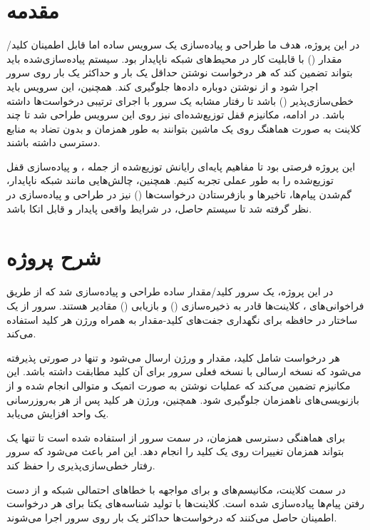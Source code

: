 \section*{مقدمه}

در این پروژه، هدف ما طراحی و پیاده‌سازی یک سرویس ساده اما قابل اطمینان کلید/مقدار () با قابلیت کار در محیط‌های شبکه ناپایدار بود. سیستم پیاده‌سازی‌شده باید بتواند تضمین کند که هر درخواست نوشتن حداقل یک بار و حداکثر یک بار روی سرور اجرا شود و از نوشتن دوباره داده‌ها جلوگیری کند. همچنین، این سرویس باید خطی‌سازی‌پذیر () باشد تا رفتار مشابه یک سرور  با اجرای ترتیبی درخواست‌ها داشته باشد. در ادامه، مکانیزم قفل توزیع‌شده‌ای نیز روی این سرویس طراحی شد تا چند کلاینت به صورت هماهنگ روی یک ماشین بتوانند به طور همزمان و بدون تضاد به منابع دسترسی داشته باشند.

این پروژه فرصتی بود تا مفاهیم پایه‌ای رایانش توزیع‌شده از جمله ،  و پیاده‌سازی قفل توزیع‌شده را به طور عملی تجربه کنیم. همچنین، چالش‌هایی مانند شبکه ناپایدار، گم‌شدن پیام‌ها، تاخیرها و بازفرستادن درخواست‌ها () نیز در طراحی و پیاده‌سازی در نظر گرفته شد تا سیستم حاصل، در شرایط واقعی پایدار و قابل اتکا باشد.

\section*{شرح پروژه}

در این پروژه، یک سرور کلید/مقدار ساده طراحی و پیاده‌سازی شد که از طریق فراخوانی‌های ، کلاینت‌ها قادر به ذخیره‌سازی () و بازیابی () مقادیر هستند. سرور از یک ساختار  در حافظه برای نگهداری جفت‌های کلید-مقدار به همراه ورژن  هر کلید استفاده می‌کند.

هر درخواست  شامل کلید، مقدار و ورژن ارسال می‌شود و تنها در صورتی پذیرفته می‌شود که نسخه ارسالی با نسخه فعلی سرور برای آن کلید مطابقت داشته باشد. این مکانیزم تضمین می‌کند که عملیات نوشتن به صورت اتمیک و متوالی انجام شده و از بازنویسی‌های ناهمزمان جلوگیری شود. همچنین، ورژن هر کلید پس از هر به‌روزرسانی یک واحد افزایش می‌یابد.

برای هماهنگی دسترسی همزمان، در سمت سرور از   استفاده شده است تا تنها یک  بتواند همزمان تغییرات روی یک کلید را انجام دهد. این امر باعث می‌شود که سرور رفتار خطی‌سازی‌پذیری را حفظ کند.

در سمت کلاینت، مکانیسم‌های  و  برای مواجهه با خطاهای احتمالی شبکه و از دست رفتن پیام‌ها پیاده‌سازی شده است. کلاینت‌ها با تولید شناسه‌های یکتا برای هر درخواست  اطمینان حاصل می‌کنند که درخواست‌ها حداکثر یک بار روی سرور اجرا می‌شوند.

